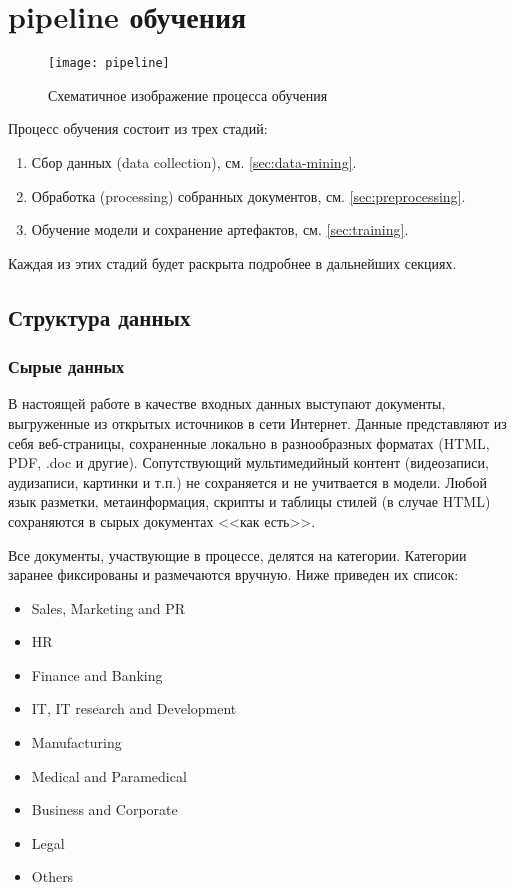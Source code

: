
\chapter{\Gls{pipeline} обучения}
\begin{figure}[h]
    \centering
    \texttt{[image: pipeline]}
    \caption{Схематичное изображение процесса обучения}
    \label{fig:pipeline}
\end{figure}

Процесс обучения состоит из трех стадий:
\begin{enumerate}
    \item Сбор данных (data collection), см. \ref{sec:data-mining}.
    \item Обработка (processing) собранных документов, см. \ref{sec:preprocessing}.
    \item Обучение модели и сохранение артефактов, см. \ref{sec:training}.
\end{enumerate}
Каждая из этих стадий будет раскрыта подробнее в дальнейших секциях.

\section{Структура данных}
\subsection{Сырые данных}
В настоящей работе в качестве входных данных выступают документы, выгруженные из открытых источников в сети Интернет.
Данные представляют из себя веб-страницы, сохраненные локально в разнообразных форматах (HTML, PDF, .doc и другие).
Сопутствующий мультимедийный контент (видеозаписи, аудизаписи, картинки и т.п.) не сохраняется и не учитвается в модели.
Любой язык разметки, метаинформация, скрипты и таблицы стилей (в случае HTML) сохраняются в сырых документах <<как есть>>.

Все документы, участвующие в процессе, делятся на категории.
Категории заранее фиксированы и размечаются вручную.
Ниже приведен их список:
\label{categories}
\begin{itemize}
    \item Sales, Marketing and PR
    \item HR
    \item Finance and Banking
    \item IT, IT research and Development
    \item Manufacturing
    \item Medical and Paramedical
    \item Business and Corporate
    \item Legal
    \item Others
\end{itemize}

